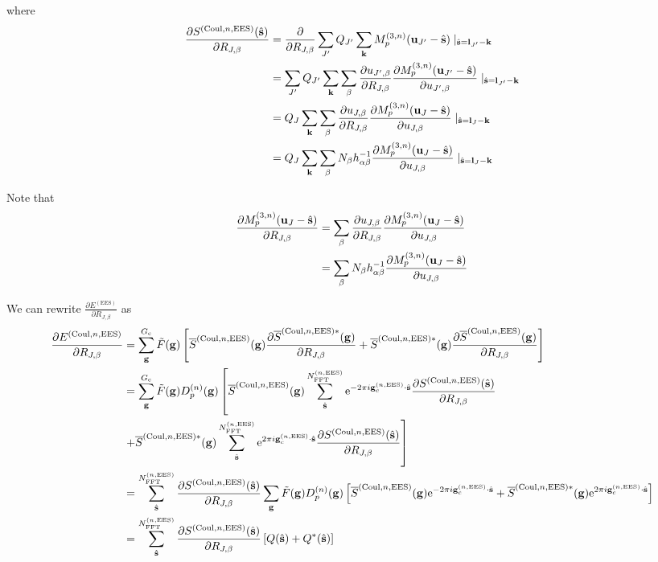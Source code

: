 \documentclass[paper=a4, fontsize=11pt]{article} %
\numberwithin{equation}{section} %
\numberwithin{figure}{section} %
\numberwithin{table}{section} %
\newcommand{\p}{\partial}
\newcommand{\ol}{\overline}
\newcommand{\bu}{{\bf{u}}}
\newcommand{\bl}{{\bf{l}}}
\newcommand{\bk}{{\bf{k}}}
\newcommand{\bs}{{\bf{s}}}
\newcommand{\bg}{{\bf{g}}}
\newcommand{\rEES}{{\mathrm{EES}}}
\newcommand{\re}{{\mathrm{e}}}
\newcommand{\rCo}{{\mathrm{Coul}}}
\newcommand{\gcnEES}{{\bg_c^{(n,\rEES)}}}
\newcommand{\al}{{\alpha}}
\newcommand{\RJb}{{R_{J,\beta}}}
\newcommand{\NFFTnEES}{{N^{(n,\rEES)}_{\mathrm{FFT}}}}
\newcommand{\Gc}{{G_{\mathrm{c}}}}
\newcommand{\Dng}{{D^{(n)}_p(\bg)}}
\newcommand{\Mn}{{M_p^{(3,n)}}}
\begin{document}
where
\begin{equation} \label{eq:dSdR}
\begin{split}
\frac{\p S ^{(\rCo,n,\rEES)} (\hat \bs)}{\p \RJb}
&= \frac{\p }{\p \RJb} \sum_{J'} Q_{J'}\sum_\bk \Mn(\bu_{J'}-\hat \bs)\mid_{\hat \bs=\bl_{J'}-\bk} \\
&= \sum_{J'} Q_{J'}\sum_\bk \sum_\beta \frac{\p u_{J',\beta}}{\p \RJb} \frac{\p \Mn(\bu_{J'}-\hat \bs)}{\p u_{J',\beta}}\mid_{\hat \bs=\bl_{J'}-\bk}\\
&= Q_J\sum_\bk\sum_\beta \frac{\p u_{J,\beta}}{\p \RJb} \frac{\p \Mn(\bu_{J}-\hat \bs)}{\p u_{J,\beta}}\mid_{\hat \bs=\bl_{J}-\bk}\\
&= Q_J\sum_\bk\sum_\beta N_\beta h_{\al\beta}^{-1} \frac{\p \Mn(\bu_{J}-\hat \bs)}{\p u_{J,\beta}}\mid_{\hat \bs=\bl_{J}-\bk}
\end{split}
\end{equation}


Note that
\begin{equation} \label{eq:dMdR}
\begin{split}
\frac{\p \Mn(\bu_{J}-\hat \bs)}{\p \RJb}
&= \sum_\beta \frac{\p u_{J,\beta}}{\p \RJb} \frac{\p \Mn(\bu_{J}-\hat \bs)}{\p u_{J,\beta}} \\
&= \sum_\beta N_\beta h_{\al\beta}^{-1} \frac{\p \Mn(\bu_{J}-\hat \bs)}{\p u_{J,\beta}}
\end{split}
\end{equation}


We can rewrite $\frac{\p E^{(\rEES)}}{\p \RJb} $ as
\begin{equation}
\begin{split}
\frac{\p E^{(\rCo,n,\rEES)}}{\p \RJb} 
&= \sum_\bg^\Gc \tilde F(\bg) \left[\ol S^{(\rCo,n,\rEES)}(\bg)\frac{\p \ol S^{(\rCo,n,\rEES)*}(\bg)}{\p \RJb} + \ol S^{(\rCo,n,\rEES)*}(\bg)\frac{\p \ol S^{(\rCo,n,\rEES)}(\bg)}{\p \RJb}\right] \\
&= \sum_\bg^\Gc \tilde F(\bg) \Dng\left[\ol S^{(\rCo,n,\rEES)}(\bg)\sum_{\hat \bs}^\NFFTnEES \re^{-2\pi i\gcnEES \cdot \hat\bs} \frac{\p S^{(\rCo,n,\rEES)} (\hat \bs)}{\p \RJb} \right. \\
&\left. + \ol S^{(\rCo,n,\rEES)*}(\bg)\sum_{\hat \bs}^\NFFTnEES \re^{2\pi i\gcnEES \cdot \hat\bs} \frac{\p S^{(\rCo,n,\rEES)} (\hat \bs)}{\p \RJb}\right] \\
&= \sum_{\hat \bs}^\NFFTnEES \frac{\p S^{(\rCo,n,\rEES)} (\hat \bs)}{\p \RJb} \sum_\bg \tilde F(\bg) \Dng\left[\ol S^{(\rCo,n,\rEES)}(\bg) \re^{-2\pi i\gcnEES \cdot \hat\bs} + \ol S^{(\rCo,n,\rEES)*}(\bg)\re^{2\pi i\gcnEES \cdot \hat\bs}\right]\\
&= \sum_{\hat \bs}^\NFFTnEES \frac{\p S^{(\rCo,n,\rEES)} (\hat \bs)}{\p \RJb} \left[Q(\hat \bs) + Q^*(\hat \bs)\right]
\end{split}
\end{equation}
\end{document}
